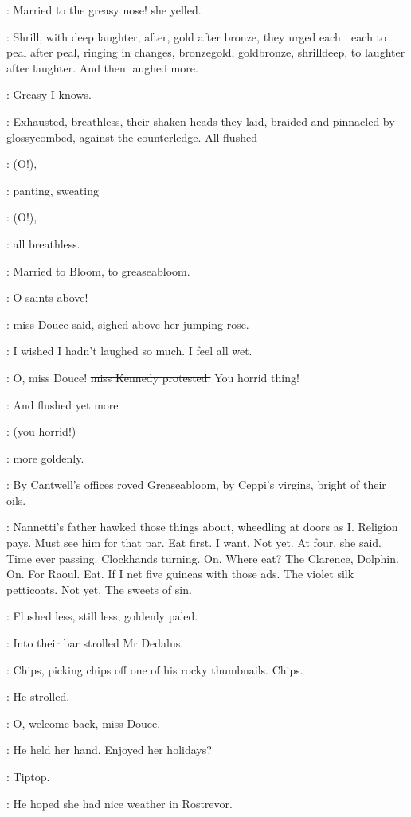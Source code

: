 \MissD:
Married to the greasy nose!
\sout{she yelled.}

:
Shrill,
with deep laughter,
after,
gold after bronze,
they urged each |
each to peal after peal,
ringing in changes,
bronzegold,
goldbronze,
shrilldeep,
to laughter after laughter.
And then laughed more.

\MissK:
Greasy I knows.

:
Exhausted,
breathless,
their shaken heads they laid,
braided and pinnacled by glossycombed,
against the counterledge.
All flushed

\MissesDK:
(O!),

:
panting,
sweating

\MissesDK:
(O!),

:
all breathless.

:
Married to Bloom,
to greaseabloom.

\MissD:
O saints above!

:
miss Douce said,
sighed above her jumping rose.

\MissD:
I wished I hadn't laughed so much.
I feel all wet.

\MissK:
O, miss Douce!
\sout{miss Kennedy protested.}
You horrid thing!

:
And flushed yet more

\MissK:
(you horrid!)

:
more goldenly.

:
By Cantwell's offices roved Greaseabloom,
by Ceppi's virgins,
bright of their oils.

\BloomInt:
Nannetti's father hawked those things about,
wheedling at doors as I.
Religion pays.
Must see him for that par.
Eat first.
I want.
Not yet.
At four,
she said.
Time ever passing.
Clockhands turning.
On.
Where eat?
The Clarence,
Dolphin.
On.
For Raoul.
Eat.
If I net five guineas with those ads.
The violet silk petticoats.
Not yet.
The sweets of sin.

:
Flushed less,
still less,
goldenly paled.

:
Into their bar strolled Mr Dedalus.

:
Chips,
picking chips off one of his rocky thumbnails.
Chips.

:
He strolled.

\simon:
O,
welcome back,
miss Douce.

:
He held her hand.
Enjoyed her holidays?

\MissD:
Tiptop.

:
He hoped she had nice weather in Rostrevor.

